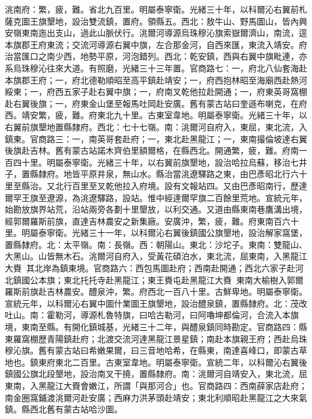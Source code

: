\begin{pinyinscope}
洮南府：繁，疲，難。省北九百里。明屬泰寧衛。光緒三十年，以科爾沁右翼前札薩克圖王旗墾地，設治雙流鎮，置府。領縣五。西北：敖牛山、野馬圖山，皆內興安嶺東南迤出支山，過此山脈伏行。洮爾河導源烏珠穆沁旗索嶽爾濟山，南流，逕本旗郡王府東流；交流河導源右翼中旗，左合那金河，自西來匯，東流入靖安。府治當匯口之南少西，地勢平原，河泡錯列。西北：乾安鎮，西與右翼中旗毗連，亦系烏珠穆沁往來大道。有照磨，光緒三十三年置。官商路七：一，府北八仙套海赴本旗郡王府；一，府北德勒順昭至高平鎮赴靖安；一，府西抱林昭至海廟西赴熱河綏東；一，府西五家子赴右翼中旗；一，府南叉乾他拉赴開通；一，府東英哥窩棚赴右翼後旗；一，府東金山堡至報馬吐岡赴安廣。舊有蒙古站曰奎遜布喇克，在府西。靖安繁，疲，難。府東北九十里。古東室韋地。明屬泰寧衛。光緒三十年，以右翼前旗墾地置縣隸府。西北：七十七嶺。南：洮爾河自府入，東屈，東北流，入鎮東。官商路三：一，南英哥套赴府；一，東北赴黑龍江；一，東南撮倫坡達右翼後旗赴吉林。舊有蒙古站諾木齊伯里額爾格，在縣西北。開通繁，疲，難。府南一百四十里。明屬泰寧衛。光緒三十年，以右翼前旗墾地，設治哈拉烏蘇，移治七井子，置縣隸府。地皆平原井泉，無山水。縣治當洮遼驛路之東，由巴彥昭北行六十里至縣治。又北行百里至叉乾他拉入府境。設有文報站四。又由巴彥昭南行，歷達爾罕王旗至遼源，為洮遼驛路，設站。惟中經達爾罕旗二百餘里荒地。宣統元年，始勘放旗界站荒，沿站兩旁各劃十里墾放，以利交通。又道由縣東南巷鷹溝出境，經郭爾羅斯前旗，直達吉林農安之新集廠。安廣沖，繁，疲，難。府東南百六十里。明屬泰寧衛。光緒三十一年，以科爾沁右翼後鎮國公旗墾地，設治解家窩堡，置縣隸府。北：太平嶺。南：長嶺。西：朝陽山。東北：沙坨子。東南：雙龍山、大黑山。山皆無木石。洮爾河自府入，受黃花碩泊水，東北流，屈東南，入黑龍江大賚，其北岸為鎮東境。官商路六：西包馬圖赴府；西南赴開通；西北六家子赴河北鎮國公本旗；東北托托寺赴黑龍江；東王賚屯赴黑龍江大賚；東南大榆樹入郭爾羅斯前旗赴吉林農安。醴泉沖，繁。府西北一百八十里。古鮮卑地。明屬泰寧衛。宣統元年，以科爾沁右翼中圖什業圖王旗墾地，設治醴泉鎮，置縣隸府。北：茂改吐山。南：霍勒河，導源札魯特旗，曰哈古勒河，曰阿嚕坤都倫河，合流入本旗境，東南至縣。有開化鎮城基，光緒三十二年，與醴泉鎮同時勘定。官商路四：縣東羅窩棚歷青陽鎮赴府；北渡交流河達黑龍江景星鎮；南赴本旗親王府；西赴烏珠穆沁旗。舊有蒙古站曰希嫩果爾，曰三音地哈希，在縣東，南達喜峰口，即蒙古草地也。鎮東府東北二百里。古東室韋地。明屬泰寧衛。宣統二年，以科爾沁右翼後鎮國公旗北段墾地，設治南叉干撓，置縣隸府。南：洮爾河自靖安入，東北流，屈東南，入黑龍江大賚會嫩江，所謂「與那河合」也。官商路四：西南薛家店赴府；南金圈窩鋪渡洮爾河赴安廣；西麻力洪茅頭赴靖安；東北利順昭赴黑龍江之大來氣鎮。縣西北舊有蒙古站哈沙圖。


\end{pinyinscope}